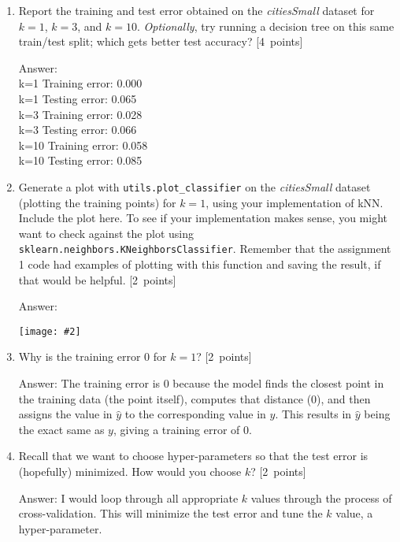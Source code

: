 \documentclass{article}
\newcommand{\blu}[1]{{\textcolor{blu}{#1}}}
\newenvironment{answer}{\par\begingroup\color{gre}Answer: }{\endgroup}
\let\ask\blu
\newcommand\pts[1]{\textcolor{pointscolour}{[#1~points]}}
\newcommand{\centerfig}[2]{\begin{center}\texttt{[image: \#2]}\end{center}}
\begin{document}
\begin{enumerate}
\begin{answer}
\begin{verbatim}
            return y_hat
        \end{verbatim}
        \end{answer}
        \item \ask{Report the training and test error} obtained on the \emph{citiesSmall} dataset for $k=1$, $k=3$, and $k=10$. \emph{Optionally}, try running a decision tree on this same train/test split; which gets better test accuracy? \pts{4}
        \begin{answer} \\
        k=1    Training error: 0.000 \\
        k=1    Testing error: 0.065 \\
        k=3    Training error: 0.028 \\
        k=3    Testing error: 0.066 \\
        k=10    Training error: 0.058 \\
        k=10    Testing error: 0.085
        \end{answer}
        \item Generate a plot with \texttt{utils.plot\_classifier} on the \emph{citiesSmall} dataset (plotting the training points) for $k=1$, using your implementation of kNN. \ask{Include the plot here.} To see if your implementation makes sense, you might want to check against the plot using \texttt{sklearn.neighbors.KNeighborsClassifier}. Remember that the assignment 1 code had examples of plotting with this function and saving the result, if that would be helpful. \pts{2}
        \begin{answer}
        \centerfig{.5}{figs/k1_graph.png}
        \end{answer}
        \item Why is the training error $0$ for $k=1$? \pts{2}
        \begin{answer}
        The training error is $0$ because the model finds the closest point in the training data (the point itself), computes that distance (0), and then assigns the value in $\hat{y}$ to the corresponding value in $y$. This results in $\hat{y}$ being the exact same as $y$, giving a training error of $0$. 
        \end{answer}
        \item Recall that we want to choose hyper-parameters so that the test error is (hopefully) minimized. How would you choose $k$? \pts{2}
        \begin{answer}
        I would loop through all appropriate $k$ values through the process of cross-validation. This will minimize the test error and tune the $k$ value, a hyper-parameter.
        \end{answer}
    \end{enumerate}
\end{document}
